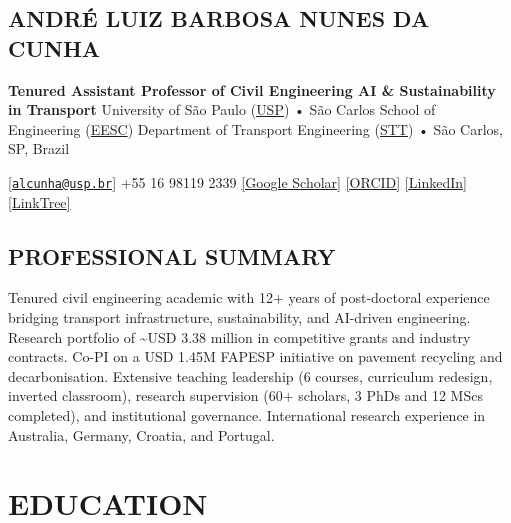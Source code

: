 \documentclass[
  10pt,
  a4paper,
  DIV=11,
  numbers=noendperiod]{scrartcl}
\author{}
\date{}
\begin{document}
\subsection*{ANDRÉ LUIZ BARBOSA NUNES DA
CUNHA}\label{andruxe9-luiz-barbosa-nunes-da-cunha}

\textbf{Tenured Assistant Professor of Civil Engineering \textbar{} AI
\& Sustainability in Transport} University of São Paulo
(\href{https://www5.usp.br/en}{USP}) • São Carlos School of Engineering
(\href{https://eesc.usp.br/en/}{EESC}) Department of Transport
Engineering (\href{https://eesc.usp.br/ppgs/stt/}{STT}) • São Carlos,
SP, Brazil

{[}\href{mailto:alcunha@usp.br}{\nolinkurl{alcunha@usp.br}}{]}
\textbar{} +55 16 98119 2339 \textbar{}
\href{https://scholar.google.com.br/citations?user=HI0CQJMAAAAJ&hl=en}{{[}Google
Scholar{]}} \textbar{}
\href{https://orcid.org/0000-0002-0520-0621}{{[}ORCID{]}} \textbar{}
\href{https://www.linkedin.com/in/prof-alcunha/}{{[}LinkedIn{]}}
\textbar{} \href{https://linktr.ee/prof_alcunha}{{[}LinkTree{]}}

\hrulefill

\subsection{PROFESSIONAL SUMMARY}\label{professional-summary}

Tenured civil engineering academic with 12+ years of post-doctoral
experience bridging transport infrastructure, sustainability, and
AI-driven engineering. Research portfolio of \textasciitilde USD 3.38
million in competitive grants and industry contracts. Co-PI on a USD
1.45M FAPESP initiative on pavement recycling and decarbonisation.
Extensive teaching leadership (6 courses, curriculum redesign, inverted
classroom), research supervision (60+ scholars, 3 PhDs and 12 MScs
completed), and institutional governance. International research
experience in Australia, Germany, Croatia, and Portugal.

\hrulefill

\section{EDUCATION}\label{education}
\end{document}
